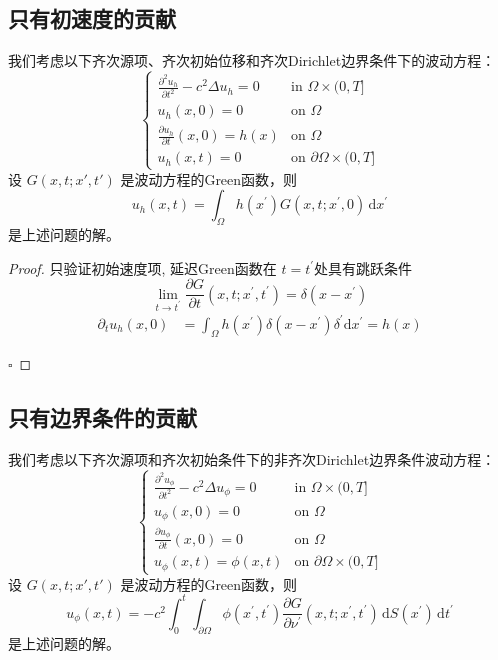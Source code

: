 \documentclass[../../main.tex]{subfiles}
\begin{document}
\subsection{只有初速度的贡献}
\begin{theorem}
    我们考虑以下齐次源项、齐次初始位移和齐次Dirichlet边界条件下的波动方程：
    $$ \begin{cases} \frac{\partial^2 u_h}{\partial t^2} - c^2 \Delta u_h = 0 & \text{in } \Omega \times (0, T] \\ u_h(x,0) = 0 & \text{on } \Omega \\ \frac{\partial u_h}{\partial t}(x,0) = h(x) & \text{on } \Omega \\ u_h(x,t) = 0 & \text{on } \partial \Omega \times (0, T] \end{cases} $$
    设 $G(x,t; x',t')$ 是波动方程的Green函数，则
    $$ u_{h}(x,t)= \int_{ \Omega }h(x^{\prime} )G(x,t;x^{\prime} ,0)\,\mathrm{d} x^{\prime} $$
    是上述问题的解。
\end{theorem}
\begin{proof}
    只验证初始速度项, 延迟Green函数在 \(  t= t^{\prime}   \)处具有跳跃条件  \[
    \lim_{t \to t^{\prime} }\frac{\partial G}{\partial t}\left( x,t;x^{\prime} ,t^{\prime}  \right)=  \delta \left( x-x^{\prime}  \right)  
    \]\[
    \begin{aligned}
     \partial _{t}u_{h}\left( x,0 \right)&= \int_{ \Omega }h\left( x^{\prime}  \right) \delta \left( x-x^{\prime}  \right) \delta ^{\prime}\mathrm{d} x^{\prime} = h\left( x \right)    
    \end{aligned}   
    \]

    \hfill $\square$
\end{proof}
\subsection{只有边界条件的贡献}

\begin{theorem}
    我们考虑以下齐次源项和齐次初始条件下的非齐次Dirichlet边界条件波动方程：
    $$ \begin{cases} \frac{\partial^2 u_\phi}{\partial t^2} - c^2 \Delta u_\phi = 0 & \text{in } \Omega \times (0, T] \\ u_\phi(x,0) = 0 & \text{on } \Omega \\ \frac{\partial u_\phi}{\partial t}(x,0) = 0 & \text{on } \Omega \\ u_\phi(x,t) = \phi(x,t) & \text{on } \partial \Omega \times (0, T] \end{cases} $$
    设 $G(x,t; x',t')$ 是波动方程的Green函数，则
    $$ u_{\phi}(x,t)= -c^2 \int_{0}^{t}\int_{\partial \Omega }\phi(x^{\prime} ,t^{\prime} )\frac{\partial G}{\partial \nu^{\prime}}(x,t;x^{\prime} ,t^{\prime} )\,\mathrm{d} S(x^{\prime} )\,\mathrm{d} t^{\prime} $$
    是上述问题的解。
\end{theorem}
\end{document}
